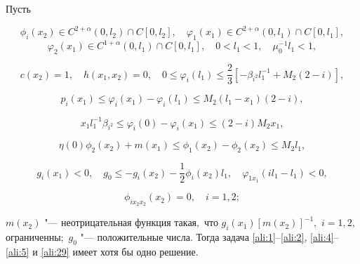 \begin{theorem}[6]Пусть 

$$\phi_i(x_2)\in C^{2+\alpha}(0, l_2)\cap C[0, l_2], \quad \varphi_1(x_1)\in C^{2+\alpha}(0, l_1)\cap C[0,l_1],$$ $$\varphi_2(x_1)\in C^{1+\alpha}(0, l_1)\cap C[0, l_1],\quad 0<l_1<1, \quad \mu_0^{-1}l_1<1,$$ 

$$c(x_2)=1, \quad h(x_1,x_2)=0,\quad 0\le\varphi_i(l_1)\le\frac{2}{3}[-\beta_{i^2}l_1^{-1}+M_2(2-i)],$$

$$p_i(x_1)\le\varphi_i(x_1)-\varphi_i(l_1)\le M_2(l_1-x_1)(2-i),$$ 

$$x_1l_1^{-1}\beta_{i^2}\le\varphi_i(0)-\varphi_i(x_1)\le(2-i)M_2x_1,$$ 

$$\eta(0)\phi_2(x_2)+m(x_1)\le\phi_1(x_2)-\phi_2(x_2)\le M_2l_1 ,$$ 

$$g_i(x_1)<0,\quad g_0\le-g_i(x_2)-\frac{1}{2}\phi_i(x_2)l_1,\quad \varphi_{1x_1}(il_1-l_1)<0,$$ 

$$\phi_{ix_2x_2}(x_2)=0,\quad i=1, 2;$$ 

$m(x_2)$ "---  неотрицательная функция такая$,$ что $g_i(x_1)[m(x_2)]^{-1},$ $i=1, 2,$ огра\-ниченны$;$ $g_0$ "--- положительные числа{\rm .} Тогда задача {\rm \eqref{ali:1}--\eqref{ali:2}{\rm ,} \eqref{ali:4}--\eqref{ali:5}} и \eqref{ali:29} имеет хотя бы одно решение{\rm .}

\end{theorem} 






%









\RusRef



